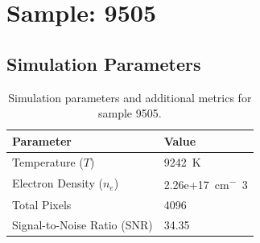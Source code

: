 \documentclass[a4paper,11pt]{article}
\begin{document}
\clearpage

\section{Sample: 9505}
\subsection{Simulation Parameters}
\begin{table}[h!]
    \centering
    \begin{tabular}{ll}
        \toprule
        \textbf{Parameter} & \textbf{Value} \\
        \midrule
        Temperature ($T$) & 9242 \,\si{K} \\
        Electron Density ($n_e$) & 2.26e+17 \,\si{cm^-3} \\
        Total Pixels & 4096 \\
        Signal-to-Noise Ratio (SNR) & 34.35 \\
        \bottomrule
    \end{tabular}
    \caption{Simulation parameters and additional metrics for sample 9505.}
    \label{tab:params_9505}
\end{table}
\end{document}
